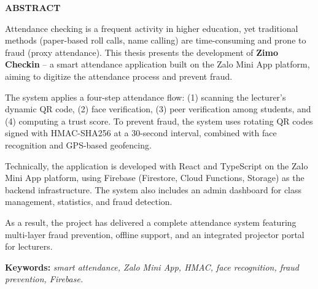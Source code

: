 \documentclass[../main.tex]{subfiles}
\begin{document}
\begin{center}
    {\Large \textbf{ABSTRACT}}
\end{center}
\vspace{0.5cm}

Attendance checking is a frequent activity in higher education, yet traditional methods (paper-based roll calls, name calling) are time-consuming and prone to fraud (proxy attendance). This thesis presents the development of \textbf{Zimo Checkin} -- a smart attendance application built on the Zalo Mini App platform, aiming to digitize the attendance process and prevent fraud.

The system applies a four-step attendance flow: (1) scanning the lecturer's dynamic QR code, (2) face verification, (3) peer verification among students, and (4) computing a trust score. To prevent fraud, the system uses rotating QR codes signed with HMAC-SHA256 at a 30-second interval, combined with face recognition and GPS-based geofencing.

Technically, the application is developed with React and TypeScript on the Zalo Mini App platform, using Firebase (Firestore, Cloud Functions, Storage) as the backend infrastructure. The system also includes an admin dashboard for class management, statistics, and fraud detection.

As a result, the project has delivered a complete attendance system featuring multi-layer fraud prevention, offline support, and an integrated projector portal for lecturers.

\vspace{0.5cm}
\textbf{Keywords:} \textit{smart attendance, Zalo Mini App, HMAC, face recognition, fraud prevention, Firebase.}
\end{document}
